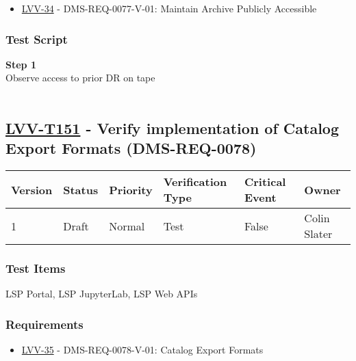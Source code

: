 \begin{itemize}
\tightlist
\item
  \href{https://jira.lsstcorp.org/browse/LVV-34}{LVV-34} -
  DMS-REQ-0077-V-01: Maintain Archive Publicly Accessible
\end{itemize}

\hypertarget{test-script-127}{%
\subsubsection{Test Script}\label{test-script-127}}

\textbf{Step 1}\\
Observe access to prior DR on tape\\
~\\

\hypertarget{lvv-t151---verify-implementation-of-catalog-export-formats-dms-req-0078}{%
\subsection{\texorpdfstring{\href{https://jira.lsstcorp.org/secure/Tests.jspa\#/testCase/LVV-T151}{LVV-T151}
- Verify implementation of Catalog Export Formats
(DMS-REQ-0078)}{LVV-T151 - Verify implementation of Catalog Export Formats (DMS-REQ-0078)}}\label{lvv-t151---verify-implementation-of-catalog-export-formats-dms-req-0078}}

\begin{longtable}[]{@{}llllll@{}}
\toprule
Version & Status & Priority & Verification Type & Critical Event &
Owner\tabularnewline
\midrule
\endhead
1 & Draft & Normal & Test & False & Colin Slater\tabularnewline
\bottomrule
\end{longtable}

\hypertarget{test-items-127}{%
\subsubsection{Test Items}\label{test-items-127}}

LSP Portal, LSP JupyterLab, LSP Web APIs~

\hypertarget{requirements-128}{%
\subsubsection{Requirements}\label{requirements-128}}

\begin{itemize}
\tightlist
\item
  \href{https://jira.lsstcorp.org/browse/LVV-35}{LVV-35} -
  DMS-REQ-0078-V-01: Catalog Export Formats
\end{itemize}

